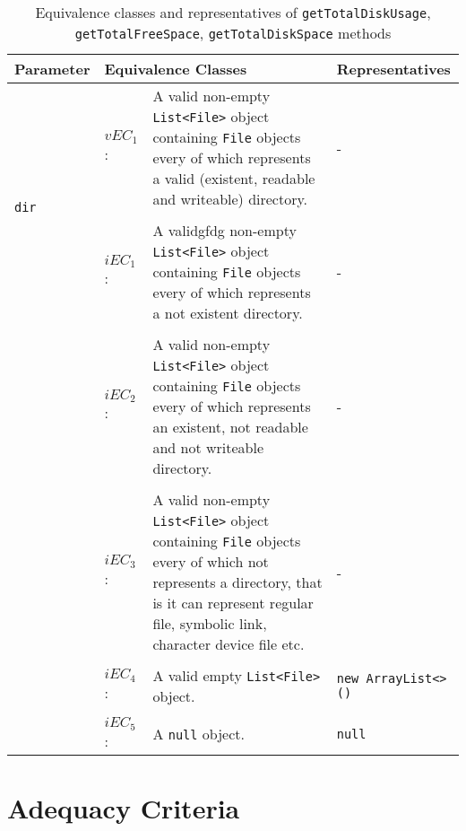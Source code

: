 \documentclass[conference]{IEEEtran}
\begin{document}
\begin{table*}
  \caption{Equivalence classes and representatives of \texttt{getTotalDiskUsage}, \texttt{getTotalFreeSpace}, \texttt{getTotalDiskSpace} methods}
  \label{tab:libraries}
  \begin{tabular}{llp{10cm}p{5cm}}
    \toprule
    \textbf{Parameter} & \multicolumn{2}{|l|}{\textbf{Equivalence Classes}} & \textbf{Representatives} \\
    \midrule
    
	\multirow{4}{*}{\texttt{dir}} & $vEC_1$: & A valid non-empty \texttt{List<File>} object containing \texttt{File} objects every of which represents a valid (existent, readable and writeable) directory. & - \\    
    
    \\[-1em] 
    & $iEC_1$: & A validgfdg non-empty \texttt{List<File>} object containing \texttt{File} objects every of which represents a not existent directory. & - \\ 
    
    \\[-1em] 
    & $iEC_2$: & A valid non-empty \texttt{List<File>} object containing \texttt{File} objects every of which represents an existent, not readable and not writeable directory. & - \\ 
    
    \\[-1em] 
    & $iEC_3$: & A valid non-empty \texttt{List<File>} object containing \texttt{File} objects every of which not represents a directory, that is it can represent regular file, symbolic link, character device file etc. & - \\ 
    
    \\[-1em]
    & $iEC_4$: & A valid empty \texttt{List<File>} object. & \texttt{new ArrayList<>()} \\
    
	\\[-1em]
    & $iEC_5$: & A \texttt{null} object. & \texttt{null} \\     
    
    \bottomrule
  \end{tabular}
\end{table*}

\section{Adequacy Criteria}
\end{document}

